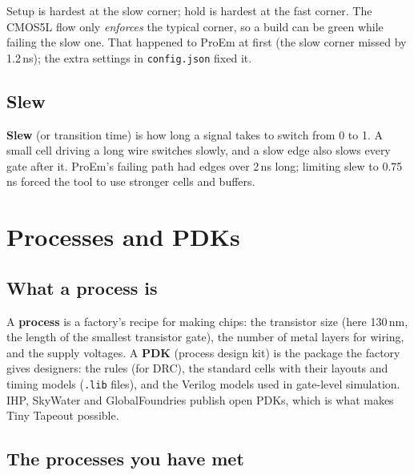 \documentclass[11pt,a4paper]{article}
\newcommand{\file}[1]{\texttt{#1}}
\begin{document}
Setup is hardest at the slow corner; hold is hardest at the fast corner. The CMOS5L flow only \emph{enforces} the typical corner, so a build can be green while failing the slow one. That happened to ProEm at first (the slow corner missed by 1.2\,ns); the extra settings in \file{config.json} fixed it.

\subsection{Slew}

\textbf{Slew} (or transition time) is how long a signal takes to switch from 0 to 1. A small cell driving a long wire switches slowly, and a slow edge also slows every gate after it. ProEm's failing path had edges over 2\,ns long; limiting slew to 0.75\,ns forced the tool to use stronger cells and buffers.

\section{Processes and PDKs}

\subsection{What a process is}

A \textbf{process} is a factory's recipe for making chips: the transistor size (here 130\,nm, the length of the smallest transistor gate), the number of metal layers for wiring, and the supply voltages. A \textbf{PDK} (process design kit) is the package the factory gives designers: the rules (for DRC), the standard cells with their layouts and timing models (\file{.lib} files), and the Verilog models used in gate-level simulation. IHP, SkyWater and GlobalFoundries publish open PDKs, which is what makes Tiny Tapeout possible.

\subsection{The processes you have met}
\end{document}
